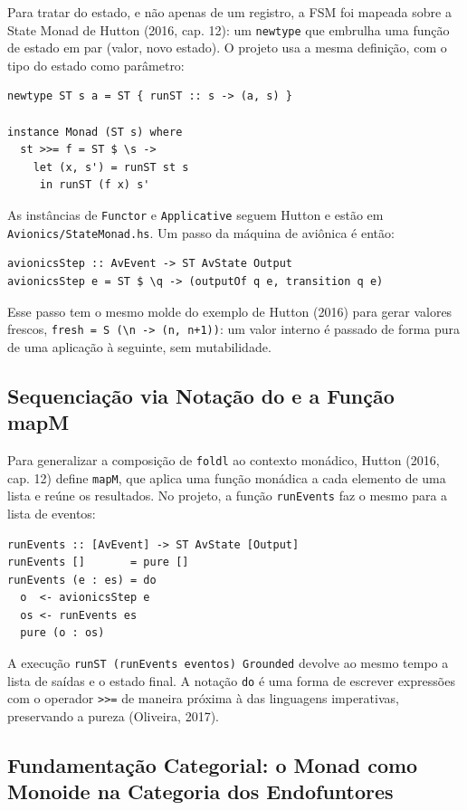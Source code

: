 \documentclass[12pt,a4paper]{article}
\begin{document}
Para tratar do estado, e não apenas de um registro, a FSM foi mapeada sobre a State Monad de Hutton (2016, cap. 12): um \texttt{newtype} que embrulha uma função de estado em par (valor, novo estado). O projeto usa a mesma definição, com o tipo do estado como parâmetro:

\begin{verbatim}
newtype ST s a = ST { runST :: s -> (a, s) }

instance Monad (ST s) where
  st >>= f = ST $ \s ->
    let (x, s') = runST st s
     in runST (f x) s'
\end{verbatim}

As instâncias de \texttt{Functor} e \texttt{Applicative} seguem Hutton e estão em \texttt{Avionics/StateMonad.hs}. Um passo da máquina de aviônica é então:

\begin{verbatim}
avionicsStep :: AvEvent -> ST AvState Output
avionicsStep e = ST $ \q -> (outputOf q e, transition q e)
\end{verbatim}

Esse passo tem o mesmo molde do exemplo de Hutton (2016) para gerar valores frescos, \texttt{fresh = S (\textbackslash n -> (n, n+1))}: um valor interno é passado de forma pura de uma aplicação à seguinte, sem mutabilidade.

\subsection{Sequenciação via Notação do e a Função mapM}

Para generalizar a composição de \texttt{foldl} ao contexto monádico, Hutton (2016, cap. 12) define \texttt{mapM}, que aplica uma função monádica a cada elemento de uma lista e reúne os resultados. No projeto, a função \texttt{runEvents} faz o mesmo para a lista de eventos:

\begin{verbatim}
runEvents :: [AvEvent] -> ST AvState [Output]
runEvents []       = pure []
runEvents (e : es) = do
  o  <- avionicsStep e
  os <- runEvents es
  pure (o : os)
\end{verbatim}

A execução \texttt{runST (runEvents eventos) Grounded} devolve ao mesmo tempo a lista de saídas e o estado final. A notação \texttt{do} é uma forma de escrever expressões com o operador \texttt{>>=} de maneira próxima à das linguagens imperativas, preservando a pureza (Oliveira, 2017).

\subsection{Fundamentação Categorial: o Monad como Monoide na Categoria dos Endofuntores}
\end{document}

